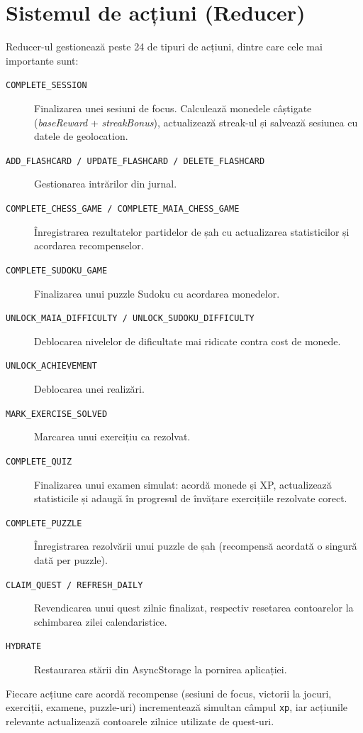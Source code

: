 \documentclass[12pt, a4paper, twoside]{report}
\numberwithin{equation}{section}
\begin{document}
\section{Sistemul de acțiuni (Reducer)}

Reducer-ul gestionează peste 24 de tipuri de acțiuni, dintre care cele mai importante sunt:

\begin{description}
  \item[\texttt{COMPLETE\_SESSION}] Finalizarea unei sesiuni de focus. Calculează monedele
    câștigate (\textit{baseReward} + \textit{streakBonus}), actualizează streak-ul și
    salvează sesiunea cu datele de geolocation.
  \item[\texttt{ADD\_FLASHCARD / UPDATE\_FLASHCARD / DELETE\_FLASHCARD}] Gestionarea
    intrărilor din jurnal.
  \item[\texttt{COMPLETE\_CHESS\_GAME / COMPLETE\_MAIA\_CHESS\_GAME}] Înregistrarea
    rezultatelor partidelor de șah cu actualizarea statisticilor și acordarea recompenselor.
  \item[\texttt{COMPLETE\_SUDOKU\_GAME}] Finalizarea unui puzzle Sudoku cu acordarea
    monedelor.
  \item[\texttt{UNLOCK\_MAIA\_DIFFICULTY / UNLOCK\_SUDOKU\_DIFFICULTY}] Deblocarea
    nivelelor de dificultate mai ridicate contra cost de monede.
  \item[\texttt{UNLOCK\_ACHIEVEMENT}] Deblocarea unei realizări.
  \item[\texttt{MARK\_EXERCISE\_SOLVED}] Marcarea unui exercițiu ca rezolvat.
  \item[\texttt{COMPLETE\_QUIZ}] Finalizarea unui examen simulat: acordă monede și XP,
    actualizează statisticile și adaugă în progresul de învățare exercițiile rezolvate corect.
  \item[\texttt{COMPLETE\_PUZZLE}] Înregistrarea rezolvării unui puzzle de șah (recompensă
    acordată o singură dată per puzzle).
  \item[\texttt{CLAIM\_QUEST / REFRESH\_DAILY}] Revendicarea unui quest zilnic finalizat,
    respectiv resetarea contoarelor la schimbarea zilei calendaristice.
  \item[\texttt{HYDRATE}] Restaurarea stării din AsyncStorage la pornirea aplicației.
\end{description}

Fiecare acțiune care acordă recompense (sesiuni de focus, victorii la jocuri, exerciții,
examene, puzzle-uri) incrementează simultan câmpul \texttt{xp}, iar acțiunile relevante
actualizează contoarele zilnice utilizate de quest-uri.
\end{document}

